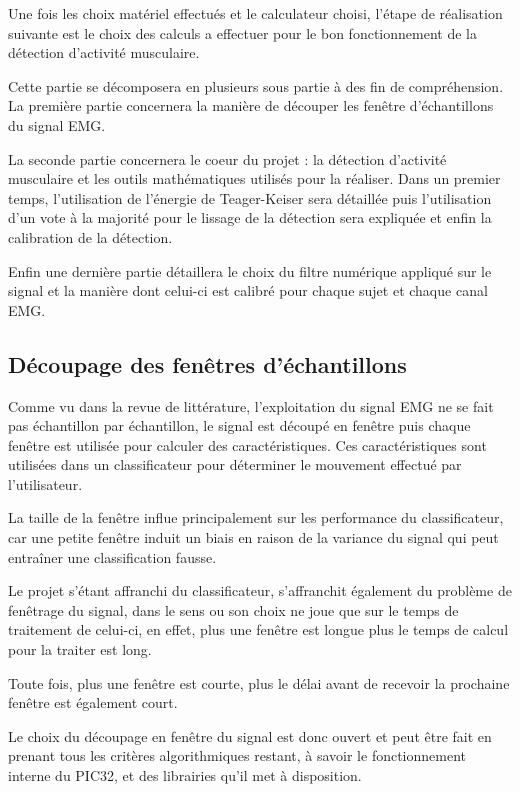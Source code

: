 \documentclass[letterpaper, twoside, 12pt, memoire, creativecommons, hyperref]{thETS}
\begin{document}
Une fois les choix matériel effectués et le calculateur choisi, l'étape de réalisation suivante est le choix des calculs a effectuer pour le bon fonctionnement de la détection d'activité musculaire. 

Cette partie se décomposera en plusieurs sous partie à des fin de compréhension. La première partie concernera la manière de découper les fenêtre d'échantillons du signal EMG. 

La seconde partie concernera le coeur du projet : la détection d'activité musculaire et les outils mathématiques utilisés pour la réaliser. Dans un premier temps, l'utilisation de l'énergie de Teager-Keiser sera détaillée puis l'utilisation d'un vote à la majorité pour le lissage de la détection sera expliquée et enfin la calibration de la détection.

Enfin une dernière partie détaillera le choix du filtre numérique appliqué sur le signal et la manière dont celui-ci est calibré pour chaque sujet et chaque canal EMG.

\subsection{Découpage des fenêtres d'échantillons}

Comme vu dans la revue de littérature, l'exploitation du signal EMG ne se fait pas échantillon par échantillon, le signal est découpé en fenêtre puis chaque fenêtre est utilisée pour calculer des caractéristiques. Ces caractéristiques sont utilisées dans un classificateur pour déterminer le mouvement effectué par l'utilisateur. 

La taille de la fenêtre influe principalement sur les performance du classificateur, car une petite fenêtre induit un biais en raison de la variance du signal qui peut entraîner une classification fausse. 

Le projet s'étant affranchi du classificateur, s'affranchit également du problème de fenêtrage du signal, dans le sens ou son choix ne joue que sur le temps de traitement de celui-ci, en effet, plus une fenêtre est longue plus le temps de calcul pour la traiter est long. 

Toute fois, plus une fenêtre est courte, plus le délai avant de recevoir la prochaine fenêtre est également court. 

Le choix du découpage en fenêtre du signal est donc ouvert et peut être fait en prenant tous les critères algorithmiques restant, à savoir le fonctionnement interne du PIC32, et des librairies qu'il met à disposition. 
\end{document}
